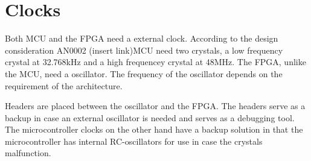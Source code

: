 \documentclass[../main/report.tex]{subfiles}
\begin{document}
\section{Clocks}
Both MCU and the FPGA need a external clock.
According to the design consideration AN0002 (insert link)MCU need two crystals, a low frequency crystal at 32.768kHz and a high frequencey crystal at 48MHz. 
The FPGA, unlike the MCU, need a oscillator. The frequency of the oscillator depends on the requirement of the architecture.

Headers are placed between the oscillator and the FPGA. 
The headers serve as a backup in case an external oscillator is needed and serves as a debugging tool.
The microcontroller clocks on the other hand have a backup solution in that the microcontroller has internal RC-oscillators for use in case the crystals malfunction.
\end{document}
